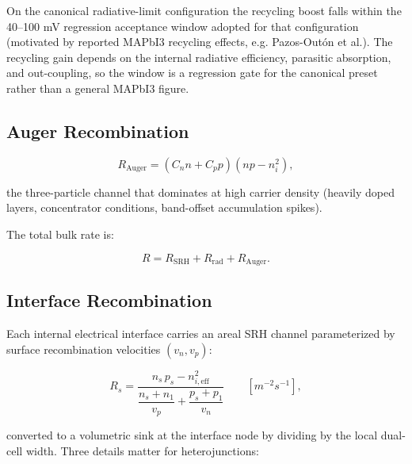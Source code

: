 \documentclass[
  11pt,
  american,
]{report}
\begin{document}
On the canonical radiative-limit configuration the recycling boost falls
within the 40--100 mV regression acceptance window adopted for that
configuration (motivated by reported MAPbI3 recycling effects, e.g.
Pazos-Outón et al.). The recycling gain depends on the internal
radiative efficiency, parasitic absorption, and out-coupling, so the
window is a regression gate for the canonical preset rather than a
general MAPbI3 figure.

\hypertarget{auger-recombination}{%
\subsection{Auger Recombination}\label{auger-recombination}}

\begin{equation}
\label{eq:auger}
R_\mathrm{Auger}
=(C_n n+C_p p)(np-n_i^2),
\end{equation}

the three-particle channel that dominates at high carrier density
(heavily doped layers, concentrator conditions, band-offset accumulation
spikes).

The total bulk rate is:

\begin{equation}
\label{eq:total-recombination}
R=R_\mathrm{SRH}+R_\mathrm{rad}+R_\mathrm{Auger}.
\end{equation}

\hypertarget{interface-recombination}{%
\subsection{Interface Recombination}\label{interface-recombination}}

Each internal electrical interface carries an areal SRH channel
parameterized by surface recombination velocities \((v_n, v_p)\):

\begin{equation}
\label{eq:interface-srh}
R_s
=
\frac{n_s\, p_s - n_{i,\mathrm{eff}}^2}
{\dfrac{n_s+n_1}{v_p} + \dfrac{p_s+p_1}{v_n}}
\qquad [m^{-2}s^{-1}],
\end{equation}

converted to a volumetric sink at the interface node by dividing by the
local dual-cell width. Three details matter for heterojunctions:
\end{document}
